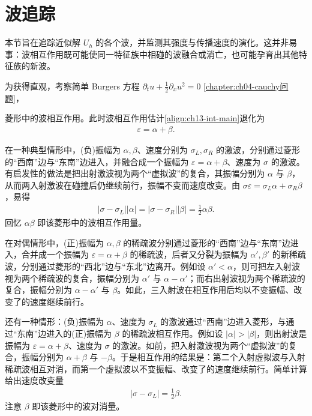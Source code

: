 \documentclass[../../main.tex]{subfiles}
\begin{document}
\section{波追踪}\label{section:ch13-波追踪}

本节旨在追踪近似解 $U_h$ 的各个波，并监测其强度与传播速度的演化。这并非易事：波相互作用既可能使同一特征族中相碰的波融合或消亡，也可能孕育出其他特征族的新波。

为获得直观，考察简单 Burgers 方程
$\partial_t u+\frac12\partial_x u^2=0$%
\cref{chapter:ch04-cauchy问题}，

菱形中的波相互作用。此时波相互作用估计\eqref{align:ch13-int-main}退化为
\begin{align}
\varepsilon=\alpha+\beta.
\end{align}

在一种典型情形中，(负)振幅为 $\alpha,\beta$、速度分别为 $\sigma_L,\sigma_R$ 的激波，分别通过菱形的``西南''边与``东南''边进入，并融合成一个振幅为 $\varepsilon=\alpha+\beta$、速度为 $\sigma$ 的激波。有启发性的做法是把出射激波视为两个``虚拟波''的复合，其振幅分别为 $\alpha$ 与 $\beta$，从而两入射激波在碰撞后仍继续前行，振幅不变而速度改变。由 $\sigma\varepsilon=\sigma_L\alpha+\sigma_R\beta$，易得
\begin{align}
|\sigma-\sigma_L||\alpha|=|\sigma-\sigma_R||\beta|=\frac12\alpha\beta.
\label{align:ch13-wt-shockcancel}
\end{align}
回忆 $\alpha\beta$ 即该菱形中的波相互作用量。

在对偶情形中，(正)振幅为 $\alpha,\beta$ 的稀疏波分别通过菱形的``西南''边与``东南''边进入，合并成一个振幅为 $\varepsilon=\alpha+\beta$ 的稀疏波，后者又分裂为振幅为 $\alpha',\beta'$ 的新稀疏波，分别通过菱形的``西北''边与``东北''边离开。例如设 $\alpha'<\alpha$，则可把左入射波视为两个稀疏波的复合，振幅分别为 $\alpha'$ 与 $\alpha-\alpha'$；而右出射波视为两个稀疏波的复合，振幅分别为 $\alpha-\alpha'$ 与 $\beta$。如此，三入射波在相互作用后均以不变振幅、改变了的速度继续前行。

还有一种情形：(负)振幅为 $\alpha$、速度为 $\sigma_L$ 的激波通过``西南''边进入菱形，与通过``东南''边进入的(正)振幅为 $\beta$ 的稀疏波相互作用。例如设 $|\alpha|>|\beta|$，则出射波是振幅为 $\varepsilon=\alpha+\beta$、速度为 $\sigma$ 的激波。如前，把入射激波视为两个``虚拟波''的复合，振幅分别为 $\alpha+\beta$ 与 $-\beta$。于是相互作用的结果是：第二个入射虚拟波与入射稀疏波相互对消，而第一个虚拟波以不变振幅、改变了的速度继续前行。简单计算给出速度改变量
\begin{align}
|\sigma-\sigma_L|=\frac12\beta.
\label{align:ch13-wt-speedchange}
\end{align}
注意 $\beta$ 即该菱形中的波对消量。
\end{document}
